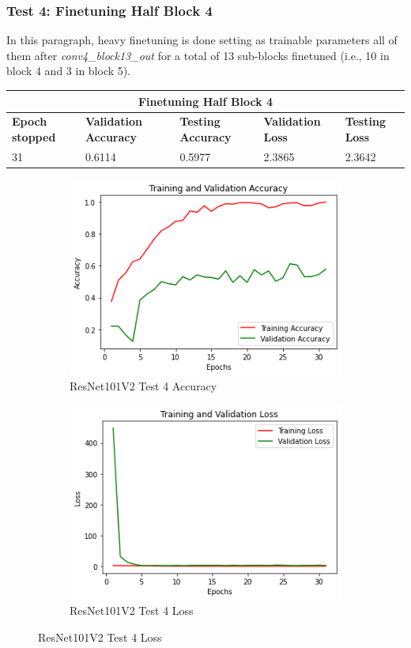\subsubsection{Test 4: Finetuning Half Block 4}
In this paragraph, heavy finetuning is done setting as trainable parameters all of them after \textit{conv4\_block13\_out} for a total of 13 sub-blocks finetuned (i.e., 10 in block 4 and 3 in block 5).

\medskip

\begin{tabular}{ |p{2cm}|p{2cm}|p{2cm}|p{2cm}|p{2cm}|  }
\hline
\multicolumn{5}{|c|}{Finetuning Half Block 4} \\
\hline
\textbf{Epoch stopped} & \textbf{Validation Accuracy} & \textbf{Testing Accuracy} & \textbf{Validation Loss} & \textbf{Testing Loss} \\
\hline
31 & 0.6114 & 0.5977 & 2.3865 & 2.3642\\
\hline
\end{tabular}

\begin{figure}[H]
	\begin{subfigure}{0.5\textwidth}
		\includegraphics[width=0.9\linewidth]{img/resnet101v2/resnet101ft4acc.png} 
		\caption{ResNet101V2 Test 4 Accuracy}
		\label{fig:resnet101ft4acc}
	\end{subfigure}
	\begin{subfigure}{0.5\textwidth}
		\includegraphics[width=0.9\linewidth]{img/resnet101v2/resnet101ft4loss.png}
		\caption{ResNet101V2 Test 4 Loss}
		\label{fig:resnet101ft4loss}
	\end{subfigure}
\end{figure}

